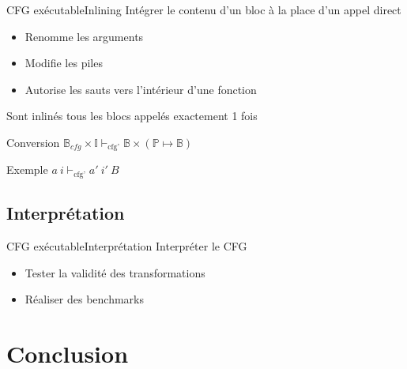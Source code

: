\documentclass{beamer}
\begin{document}
\begin{frame}{CFG exécutable}{Inlining}
    Intégrer le contenu d'un bloc à la place d'un appel direct

    \begin{itemize}
        \item Renomme les arguments
        \item Modifie les piles
        \item Autorise les sauts vers l'intérieur d'une fonction
    \end{itemize}

    Sont inlinés tous les blocs appelés exactement 1 fois

    \begin{block}{Conversion}
        $\mathbb{B}_{cfg} \times \mathbb{I} \vdash_{\text{cfg'}} \mathbb{B} \times (\mathbb{P} \mapsto \mathbb{B})$
    \end{block}

    \begin{exampleblock}{Exemple}
        $a ~ i \vdash_{\text{cfg'}} a' ~ i' ~ B$
    \end{exampleblock}
\end{frame}

\subsection{Interprétation}

\begin{frame}{CFG exécutable}{Interprétation}
    Interpréter le CFG

    \begin{itemize}
        \item Tester la validité des transformations
        \item Réaliser des benchmarks
    \end{itemize}
\end{frame}

\section{Conclusion}
\end{document}
